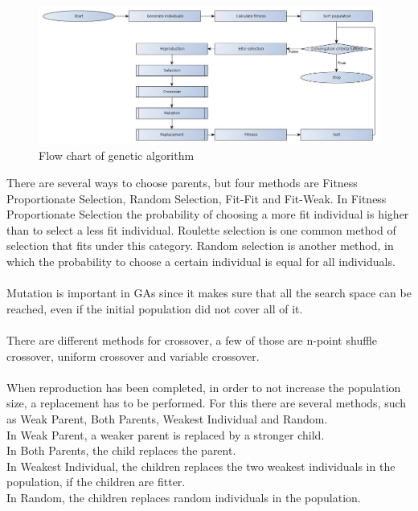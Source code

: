 \begin{figure}[hb]
  \centering
  \includegraphics[width=6in]{chapter_4_methods/GeneticFlowChart.jpg}
  \caption[Flow chart of genetic algorithm]%
  {Flow chart of genetic algorithm}
\end{figure}
There are several ways to choose parents, but four methods are Fitness Proportionate Selection, Random Selection, Fit-Fit and Fit-Weak. In Fitness Proportionate Selection the probability of choosing a more fit individual is higher than to select a less fit individual. Roulette selection is one common method of selection that fits under this category. Random selection is another method, in which the probability to choose a certain individual is equal for all individuals.\\
\\Mutation is important in GAs since it makes sure that all the search space can be reached, even if the initial population did not cover all of it.\\
\\There are different methods for crossover, a few of those are n-point shuffle crossover, uniform crossover and variable crossover.\\
\\When reproduction has been completed, in order to not increase the population size, a replacement has to be performed. For this there are several methods, such as Weak Parent, Both Parents, Weakest Individual and Random.\\
In Weak Parent, a weaker parent is replaced by a stronger child.\\
In Both Parents, the child replaces the parent.\\
In Weakest Individual, the children replaces the two weakest individuals in the population, if the children are fitter.\\
In Random, the children replaces random individuals in the population.\\
